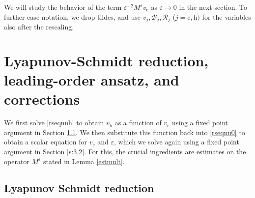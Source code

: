 \documentclass[10pt]{article}
\newcommand{\eps}{\varepsilon}
\newcommand{\B}{\mathcal{B}}
\newcommand{\Rm}{\mathcal{R}}
\begin{document}
We will study the behavior of the term $\eps^{-2}M^\eps v_\mathrm{c}$ as $\eps \to 0$ in the next section. 
To further ease notation, we drop tildes, and use $v_j,\B_j,\Rm_j$ ($j=\mathrm{c,h})$ for the variables also after the rescaling. 




\section{Lyapunov-Schmidt reduction, leading-order ansatz, and corrections}\label{s:3}



We first solve \eqref{rseqnuh} to obtain $v_\mathrm{h}$ as a function of $v_\mathrm{c}$ using a fixed point argument in Section \ref{s:3.1}. We then substitute this function back into  \eqref{rseqnu0} to obtain a scalar equation for $v_\mathrm{c}$ and $\eps$, which we solve again using a fixed point argument in Section \ref{s:3.2}. For this, the crucial ingredients are estimates on the operator $M^\eps$ stated in Lemma \ref{estmult}. 

\subsection{Lyapunov Schmidt reduction}\label{s:3.1}
\end{document}
